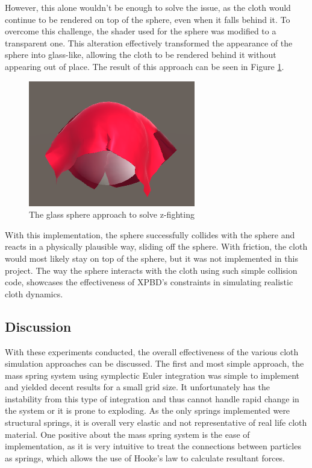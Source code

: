 \documentclass[12pt,a4paper]{article}
\begin{document}
However, this alone wouldn't be enough to solve the issue, as the cloth would continue to be rendered on top of the sphere, even when it falls behind it. To overcome this challenge, the shader used for the sphere was modified to a transparent one. This alteration effectively transformed the appearance of the sphere into glass-like, allowing the cloth to be rendered behind it without appearing out of place. The result of this approach can be seen in Figure \ref{fig:spherefixed}. \\
\begin{figure}[h]
	\centering
	\includegraphics[scale=0.5]{spherefixed.png}
	\caption{The glass sphere approach to solve z-fighting}
	\label{fig:spherefixed}
\end{figure}
With this implementation, the sphere successfully collides with the sphere and reacts in a physically plausible way, sliding off the sphere. With friction, the cloth would most likely stay on top of the sphere, but it was not implemented in this project. The way the sphere interacts with the cloth using such simple collision code, showcases the effectiveness of XPBD's constraints in simulating realistic cloth dynamics.
\subsection{Discussion}
With these experiments conducted, the overall effectiveness of the various cloth simulation approaches can be discussed. The first and most simple approach, the mass spring system using symplectic Euler integration was simple to implement and yielded decent results for a small grid size. It unfortunately has the instability from this type of integration and thus cannot handle rapid change in the system or it is prone to exploding. As the only springs implemented were structural springs, it is overall very elastic and not representative of real life cloth material. One positive about the mass spring system is the ease of implementation, as it is very intuitive to treat the connections between particles as springs, which allows the use of Hooke's law to calculate resultant forces. \\
\end{document}
